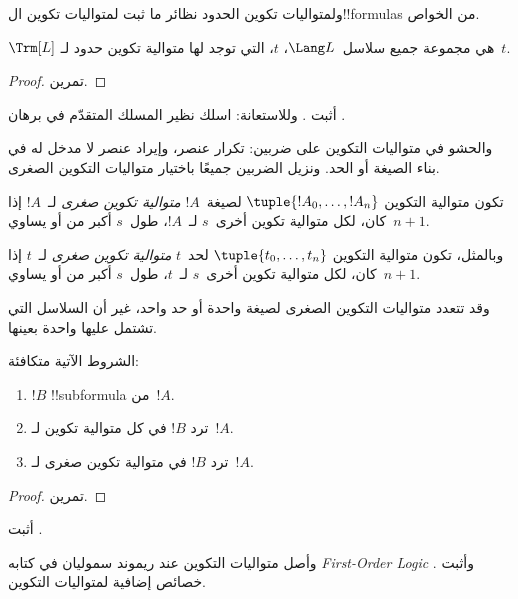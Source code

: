 \documentclass[../../../include/open-logic-section]{subfiles}
\begin{document}
ولمتواليات تكوين الحدود نظائر ما ثبت لمتواليات تكوين
ال!!{formula}s من الخواص.

\begin{prop}
$\Trm[L]$ هي مجموعة جميع سلاسل~$\Lang L$، $t$، التي توجد لها
متوالية تكوين حدود لـ~$t$.
\end{prop}

\begin{proof}
تمرين.
\end{proof}

\begin{prob}
أثبت .
وللاستعانة: اسلك نظير المسلك المتقدّم في برهان
.
\end{prob}

والحشو في متواليات التكوين على ضربين: تكرار عنصر، وإيراد عنصر
لا مدخل له في بناء الصيغة أو الحد. ونزيل الضربين جميعًا باختيار
متواليات التكوين الصغرى.

\begin{defn}
تكون متوالية التكوين $\tuple{!A_0, \ldots, !A_n}$ لصيغة~$!A$
\emph{متوالية تكوين صغرى} لـ~$!A$ إذا كان، لكل متوالية تكوين
أخرى~$s$ لـ~$!A$، طول~$s$ أكبر من أو يساوي~$n+1$.

وبالمثل، تكون متوالية التكوين $\tuple{t_0, \ldots, t_n}$
لحد~$t$ \emph{متوالية تكوين صغرى} لـ~$t$ إذا كان، لكل متوالية
تكوين أخرى~$s$ لـ~$t$، طول~$s$ أكبر من أو يساوي~$n+1$.
\end{defn}

وقد تتعدد متواليات التكوين الصغرى لصيغة واحدة أو حد واحد،
غير أن السلاسل التي تشتمل عليها واحدة بعينها.

\begin{prop}
الشروط الآتية متكافئة:
\begin{enumerate}
    \item $!B$ !!{subformula} من~$!A$.
    \item ترد $!B$ في كل متوالية تكوين لـ~$!A$.
    \item ترد $!B$ في متوالية تكوين صغرى لـ~$!A$.
\end{enumerate}
\end{prop}

\begin{proof}
تمرين.
\end{proof}

\begin{prob}
أثبت .
\end{prob}

\begin{history}
وأصل متواليات التكوين عند ريموند سموليان في كتابه
\emph{First-Order Logic} \citep{Smullyan1968}.
وأثبت \citet{Zuckerman1973} خصائص إضافية لمتواليات التكوين.
\end{history}
\end{document}
